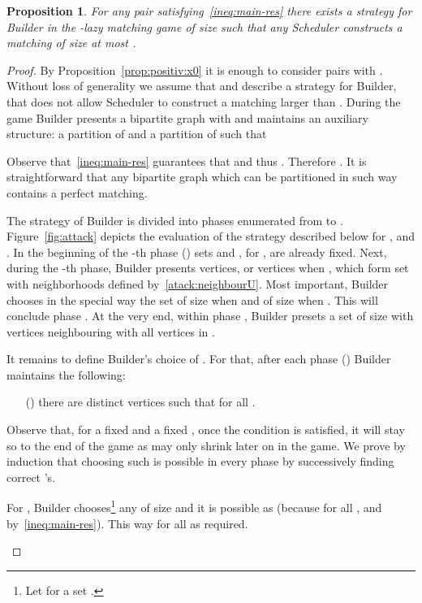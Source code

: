 \documentclass[12pt]{amsart}
\newtheorem{prop}[theorem]{Proposition}
\theoremstyle{definition}
\newcommand{\Br}{Builder\xspace}
\newcommand{\Sr}{Scheduler\xspace}
\begin{document}
\begin{prop}\label{prop:spoiler_bound}
For any pair  
satisfying~\eqref{ineq:main-res} there exists a strategy for \Br in the -lazy matching game of size  such that any \Sr constructs a matching of size at most .
\end{prop}
\begin{proof}  
By Proposition~\ref{prop:positiv:x0} it is enough  to consider pairs with .
Without loss of generality we assume that  and describe a strategy for \Br, that does not allow \Sr to construct a matching larger than .
During the game \Br presents a bipartite graph  with  and maintains an auxiliary structure:
a partition of  and a partition of  such that

Observe that~\eqref{ineq:main-res} guarantees that  and thus 
.
Therefore .
It is straightforward that any bipartite graph which can be partitioned in such way contains a perfect matching.
  
 
The strategy of \Br is divided into  phases enumerated from  to .
{Figure~\ref{fig:attack} depicts the evaluation of the strategy described below for ,  and .}
In the beginning of the -th phase () sets  and , for , are already fixed. Next, during the -th phase, \Br presents  vertices, or  vertices when , which form  set  with neighborhoods defined by~\eqref{atack:neighbourU}. 
Most important, \Br chooses in the special way the set  of size  when  and of size  when .
This will conclude phase .
At the very end, within phase , \Br presets a set  of size  with vertices neighbouring with all vertices in .
  
It remains to define \Br's choice of .
For that, after each phase  () \Br maintains the following:
\begin{itemize}
    \item[()] 
    there are  distinct vertices  such that
     for all .
\end{itemize}
Observe that, for a fixed  and a fixed ,
once the condition  is satisfied, it will stay so to the end of the game
as  may only shrink later on in the game.
We prove by induction that choosing such  is possible in every phase by successively finding correct 's. 

For , \Br chooses\footnote{Let  for a set .} any  of size  and it is possible as 
 (because  for all , and by~\eqref{ineq:main-res}).
This way  for all  as required.

\begin{figure}[tbh]
\begin{center}
\end{center}
\end{figure}
\end{proof}
\end{document}

